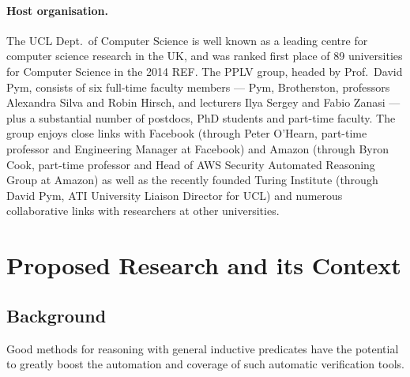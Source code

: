 \documentclass[11pt,twocolumn]{article}
\begin{document}
\paragraph{Host organisation.}
The UCL Dept.\ of Computer Science is well known as a leading centre for computer science research in the UK, and was ranked first place of 89 universities for Computer Science in the 2014 REF. The PPLV group, headed by Prof.\ David Pym, consists of six full-time faculty members --- Pym, Brotherston, professors Alexandra Silva and Robin Hirsch, and lecturers Ilya Sergey and Fabio Zanasi --- plus a substantial number of postdocs, PhD students and part-time faculty. The group enjoys close links with Facebook (through Peter O'Hearn, part-time professor and Engineering Manager at Facebook) and Amazon (through Byron Cook, part-time professor and Head of AWS Security Automated Reasoning Group at Amazon) as well as the recently founded Turing Institute (through David Pym, ATI University Liaison Director for UCL) and numerous collaborative links with researchers at other universities.

\begingroup
\footnotesize
{}
\endgroup


%

\newpage

\section{Proposed Research and its Context}

\subsection{Background}

Good methods for reasoning with general inductive predicates have the potential to greatly boost the automation and coverage of such automatic verification tools.
\end{document}
